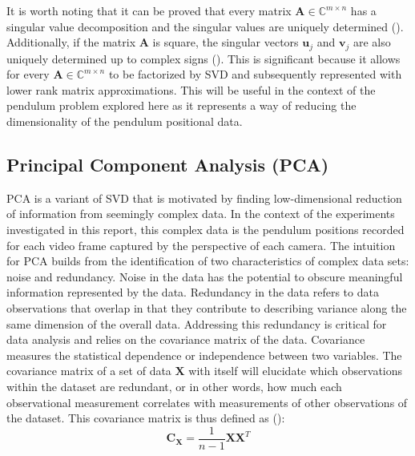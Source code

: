 \documentclass{article}
\begin{document}
It is worth noting that it can be proved that every matrix $\mathbf{A}\in\mathbb{C}^{m\times n}$ has a singular value decomposition and the singular values are uniquely determined (\cite{kutz_2013}). Additionally, if the matrix $\mathbf{A}$ is square, the singular vectors $\mathbf{u}_{j}$ and $\mathbf{v}_{j}$ are also uniquely determined up to complex signs (\cite{kutz_2013}). This is significant because it allows for every $\mathbf{A}\in\mathbb{C}^{m\times n}$ to be factorized by SVD and subsequently represented with lower rank matrix approximations. This will be useful in the context of the pendulum problem explored here as it represents a way of reducing the dimensionality of the pendulum positional data.

\subsection{Principal Component Analysis (PCA)}
PCA is a variant of SVD that is motivated by finding low-dimensional reduction of information from seemingly complex data. In the context of the experiments investigated in this report, this complex data is the pendulum positions recorded for each video frame captured by the perspective of each camera. The intuition for PCA builds from the identification of two characteristics of complex data sets: noise and redundancy. Noise in the data has the potential to obscure meaningful information represented by the data. Redundancy in the data refers to data observations that overlap in that they contribute to describing variance along the same dimension of the overall data. Addressing this redundancy is critical for data analysis and relies on the covariance matrix of the data. Covariance measures the statistical dependence or independence between two variables. The covariance matrix of a set of data $\mathbf{X}$ with itself will elucidate which observations within the dataset are redundant, or in other words, how much each observational measurement correlates with measurements of other observations of the dataset. This covariance matrix is thus defined as (\cite{kutz_2013}):
\begin{equation}\label{eq:cov}
\mathbf{C}_{\mathbf{X}} = \frac{1}{n-1}\mathbf{X}\mathbf{X^{\mathit{T}}}
\end{equation}
\end{document}

